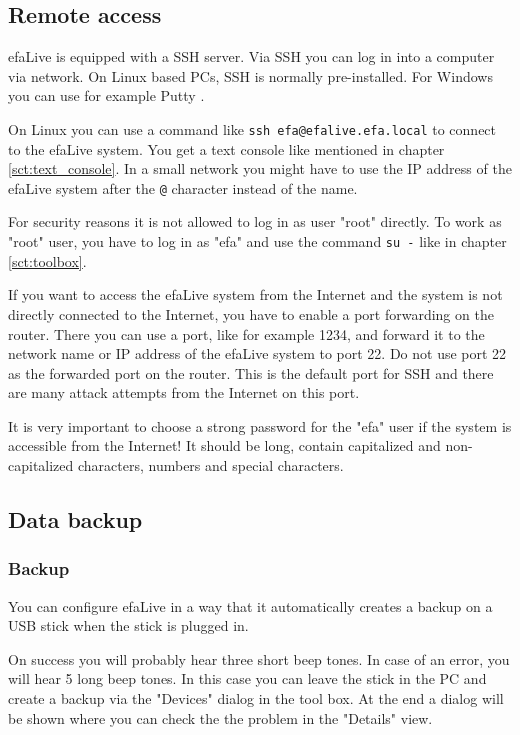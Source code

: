 \documentclass[a4paper,12pt,twoside]{article}
\begin{document}
\subsection{Remote access}
\label{sct:remote_access}
efaLive is equipped with a SSH server. Via SSH you can log in into a
computer via network. On Linux based PCs, SSH is normally
pre-installed. For Windows you can use for example Putty \cite{PUT1}.

On Linux you can use a command like \texttt{ssh
efa@efalive.efa.local} to connect to the efaLive system.
You get a text console like mentioned in chapter \ref{sct:text_console}. In a small
network you might have to use the IP address of the efaLive system
after the \texttt{@} character instead of the
name.

For security reasons it is not allowed to log in as user
"root" directly. To work as
"root" user, you have to log in as
"efa" and use the command \texttt{su -} like in chapter \ref{sct:toolbox}.

If you want to access the efaLive system from the Internet and the
system is not directly connected to the Internet, you have to enable a
port forwarding on the router. There you can use a port, like for
example 1234, and forward it to the network name or IP address of the
efaLive system to port 22. Do not use port 22 as the forwarded port on
the router. This is the default port for SSH and there are many attack
attempts from the Internet on this port.

It is very important to choose a strong password for the
"efa" user if the system is accessible from
the Internet! It should be long, contain capitalized and
non-capitalized characters, numbers and special characters.


\subsection{Data backup}
\label{sct:data_backup}
\subsubsection{Backup}
\label{sct:backup}
You can configure efaLive in a way
that it automatically creates a backup on a USB stick when the stick is
plugged in.

On success you will probably hear three short beep tones. In case of an
error, you will hear 5 long beep tones. In this case you can leave the
stick in the PC and create a backup via the "Devices" dialog in the tool 
box. At the end a dialog will be shown where you can check the the problem
in the "Details" view.
\end{document}
